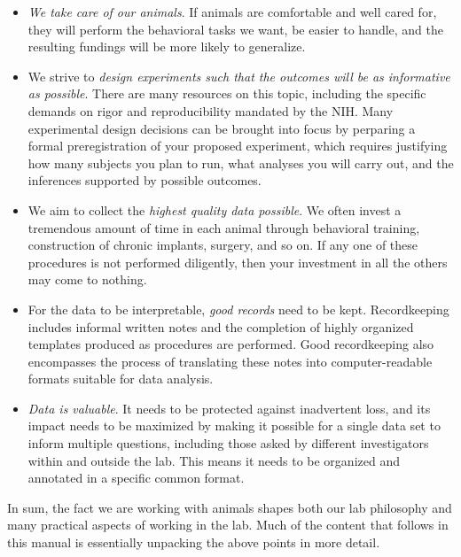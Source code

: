 \documentclass{tufte-book}
\begin{document}
\begin{itemize}

\item{{\it We take care of our animals}. If animals are comfortable and well
  cared for, they will perform the behavioral tasks we want, be easier
  to handle, and the resulting fundings will be more likely to generalize.}

\item{We strive to {\it design experiments such that the outcomes will
    be as informative as possible}. There are many resources on this
  topic, including the specific demands on rigor and reproducibility
  mandated by the
  NIH. Many
  experimental design decisions can be brought into focus by perparing
  a formal preregistration of your proposed
  experiment, which requires justifying how
  many subjects you plan to run, what analyses you will carry out, and
  the inferences supported by possible outcomes.}

\item{We aim to collect the {\it highest quality data possible}. We
  often invest a tremendous amount of time in each animal through
  behavioral training, construction of chronic implants, surgery, and
  so on. If any one of these procedures is not performed diligently,
  then your investment in all the others may come to nothing.}

\item{For the data to be interpretable, {\it good records} need to be
  kept. Recordkeeping includes informal written notes and the
  completion of highly organized templates produced as procedures are
  performed. Good recordkeeping also encompasses the process of
  translating these notes into computer-readable formats suitable for
  data analysis.}

\item{{\it Data is valuable}. It needs to be protected against inadvertent
  loss, and its impact needs to be maximized by making it possible for
  a single data set to inform multiple questions, including those
  asked by different investigators within and outside the lab. This
  means it needs to be organized and annotated in a specific common
  format.}
\end{itemize}

In sum, the fact we are working with animals shapes both our lab
philosophy and many practical aspects of working in the lab. Much of
the content that follows in this manual is essentially unpacking the
above points in more detail.
\end{document}
